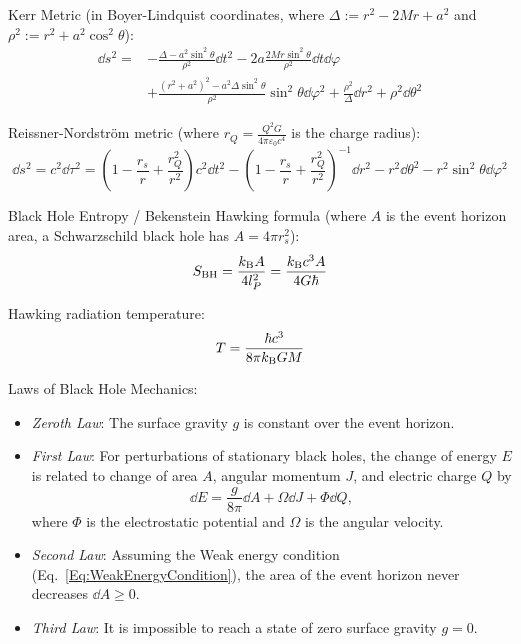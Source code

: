 			\noindent
			Kerr Metric (in Boyer-Lindquist coordinates, where $\Delta:=r^2 - 2Mr + a^2$ and $\rho^2:=r^2+a^2\cos^2\theta$):
			\begin{equation}
				\begin{aligned}
					\dd s^2 =& - \frac{\Delta - a^2 \sin^2\theta}{\rho^2} \dd t^2 - 2a\frac{2Mr\sin^2\theta}{\rho^2}\dd t \dd \varphi \\
					&+ \frac{(r^2+a^2)^2 - a^2\Delta \sin^2\theta}{\rho^2}\sin^2\theta\dd\varphi^2 + \frac{\rho^2}{\Delta}\dd r^2 + \rho^2\dd\theta^2
				\end{aligned}
			\end{equation}

			\noindent
			Reissner-Nordström metric (where $r_Q = \frac{Q^2 G}{4\pi \varepsilon_0 c^4}$ is the charge radius):
			\begin{equation}
				\dd s^{2}=c^{2}\dd\tau ^{2}=\left(1-{\frac {r_s}{r}}+{\frac {r_Q^{2}}{r^{2}}}\right)c^{2}\dd t^{2}-\left(1-{\frac {r_s}{r}}+{\frac {r_Q^{2}}{r^{2}}}\right)^{-1}\dd r^{2}-r^{2}\dd\theta ^{2}-r^{2}\sin ^{2}\theta \dd\varphi ^{2}
			\end{equation}

			\noindent
			Black Hole Entropy / Bekenstein Hawking formula (where $A$ is the event horizon area, \eg a Schwarzschild black hole has $A=4\pi r_s^2$):
			\begin{equation}
				S_\mathrm{BH} = \frac{k_{\text{B}} A}{4 l_P^2}
				= \frac{k_{\text{B}} c^3 A}{4 G \hbar}
			\end{equation}

			\noindent
			Hawking radiation temperature:
			\begin{equation}
				T = \frac{\hbar c^3}{8\pi k_{\text{B}} G M}
			\end{equation}

			\noindent
			Laws of Black Hole Mechanics:
			\begin{itemize}
				\item \emph{Zeroth Law}: The surface gravity $g$ is constant over the event horizon.
				\item \emph{First Law}: For perturbations of stationary black holes, the change of energy $E$ is related to change of area $A$, angular momentum $J$, and electric charge $Q$ by
					\begin{equation}
						\dd E = \frac{g}{8\pi} \dd A + \Omega \dd J + \Phi \dd Q,
					\end{equation}
					where $\Phi$ is the electrostatic potential and $\Omega$ is the angular velocity.
				\item \emph{Second Law}: Assuming the Weak energy condition (Eq.~\ref{Eq:WeakEnergyCondition}), the area of the event horizon never decreases $\dd A \ge 0$.
				\item \emph{Third Law}: It is impossible to reach a state of zero surface gravity $g=0$.
			\end{itemize}


